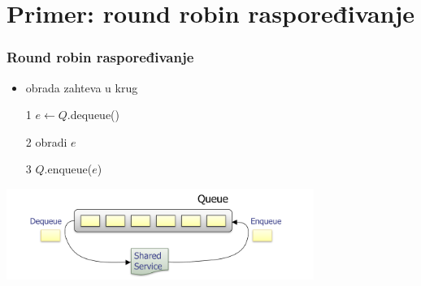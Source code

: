 \documentclass[compress]{beamer}
\begin{document}
\section[P: Round Robin]{Primer: round robin raspoređivanje}
\begin{frame}[fragile]
  \frametitle{Round robin raspoređivanje}
  \begin{itemize}
    \item obrada zahteva u krug
    \item[1] $e \leftarrow Q$.dequeue()
    \item[2] obradi $e$
    \item[3] $Q$.enqueue($e$)
  \end{itemize}
\begin{center}
  \includegraphics[width=10cm]{asp-06-pic03.png}
\end{center}
\end{frame}
\end{document}
